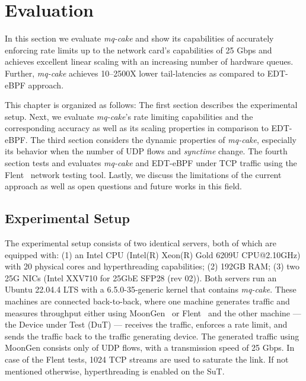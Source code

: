 \section{Evaluation}\label{sec:evaluation}
In this section we evaluate \textit{mq-cake} and show its capabilities of accurately enforcing rate limits up to the network card's capabilities of 25 Gbps and achieves excellent linear scaling with an increasing number of hardware queues.
%
Further, \textit{mq-cake} achieves 10--2500X lower tail-latencies as compared to EDT-eBPF approach.

This chapter is organized as follows:
%
The first section describes the experimental setup. 
%
Next, we evaluate \textit{mq-cake}'s rate limiting capabilities and the corresponding accuracy as well as its scaling properties in comparison to EDT-eBPF.
%
The third section considers the dynamic properties of \textit{mq-cake}, especially its behavior when the number of UDP flows and \textit{synctime} change.
%
The fourth section tests and evaluates \textit{mq-cake} and EDT-eBPF under TCP traffic using the Flent~\cite{flent} network testing tool.
%
Lastly, we discuss the limitations of the current approach as well as open questions and future works in this field.

\subsection{Experimental Setup}
The experimental setup consists of two identical servers, both of which are equipped with: 
(1) an Intel CPU (Intel(R) Xeon(R) Gold 6209U CPU@2.10GHz) with 20 physical cores and hyperthreading capabilities;
(2) 192GB RAM;
(3) two 25G NICs (Intel XXV710 for 25GbE SFP28 (rev 02)).
Both servers run an Ubuntu 22.04.4 LTS with a 6.5.0-35-generic kernel that contains \textit{mq-cake}. 
These machines are connected back-to-back, where one machine generates traffic and measures throughput either using MoonGen~\cite{moongen} or Flent~\cite{flent} and the other machine --- the Device under Test (DuT) --- receives the traffic, enforces a rate limit, and sends the traffic back to the traffic generating device.
%
The generated traffic using MoonGen consists only of UDP flows, with a transmission speed of 25 Gbps.
%
In case of the Flent tests, 1024 TCP streams are used to saturate the link.
%
If not mentioned otherwise, hyperthreading is enabled on the SuT.


